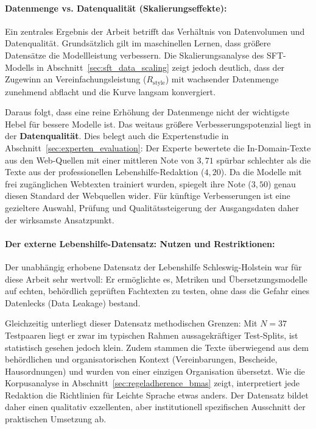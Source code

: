 \paragraph{Datenmenge vs. Datenqualität (Skalierungseffekte):}
Ein zentrales Ergebnis der Arbeit betrifft das Verhältnis von Datenvolumen und Datenqualität. Grundsätzlich gilt im maschinellen Lernen, dass größere Datensätze die Modellleistung verbessern. Die Skalierungsanalyse des SFT-Modells in Abschnitt~\ref{sec:sft_data_scaling} zeigt jedoch deutlich, dass der Zugewinn an Vereinfachungsleistung ($R_{\text{style}}$) mit wachsender Datenmenge zunehmend abflacht und die Kurve langsam konvergiert. 

Daraus folgt, dass eine reine Erhöhung der Datenmenge nicht der wichtigste Hebel für bessere Modelle ist. Das weitaus größere Verbesserungspotenzial liegt in der \textbf{Datenqualität}. Dies belegt auch die Expertenstudie in Abschnitt~\ref{sec:experten_evaluation}: Der Experte bewertete die In-Domain-Texte aus den Web-Quellen mit einer mittleren Note von $3{,}71$ spürbar schlechter als die Texte aus der professionellen Lebenshilfe-Redaktion ($4{,}20$). Da die Modelle mit frei zugänglichen Webtexten trainiert wurden, spiegelt ihre Note ($3{,}50$) genau diesen Standard der Webquellen wider. Für künftige Verbesserungen ist eine gezieltere Auswahl, Prüfung und Qualitätssteigerung der Ausgangsdaten daher der wirksamste Ansatzpunkt.

\paragraph{Der externe Lebenshilfe-Datensatz: Nutzen und Restriktionen:}
Der unabhängig erhobene Datensatz der Lebenshilfe Schleswig-Holstein war für diese Arbeit sehr wertvoll: Er ermöglichte es, Metriken und Übersetzungsmodelle auf echten, behördlich geprüften Fachtexten zu testen, ohne dass die Gefahr eines Datenlecks (Data Leakage) bestand. 

Gleichzeitig unterliegt dieser Datensatz methodischen Grenzen: Mit $N=37$ Testpaaren liegt er zwar im typischen Rahmen aussagekräftiger Test-Splits, ist statistisch gesehen jedoch klein. Zudem stammen die Texte überwiegend aus dem behördlichen und organisatorischen Kontext (Vereinbarungen, Bescheide, Hausordnungen) und wurden von einer einzigen Organisation übersetzt. Wie die Korpusanalyse in Abschnitt~\ref{sec:regeladherence_bmas} zeigt, interpretiert jede Redaktion die Richtlinien für Leichte Sprache etwas anders. Der Datensatz bildet daher einen qualitativ exzellenten, aber institutionell spezifischen Ausschnitt der praktischen Umsetzung ab.

